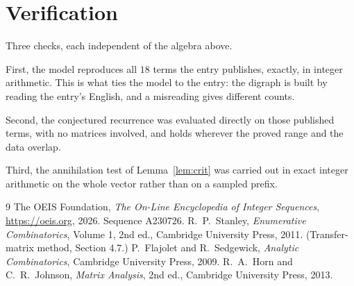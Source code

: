 \documentclass[11pt,a4paper]{article}
\theoremstyle{plain}
\theoremstyle{definition}
\begin{document}
\section{Verification}

Three checks, each independent of the algebra above.

First, the model reproduces all $18$ terms the entry publishes, exactly, in integer
arithmetic. This is what ties the model to the entry: the digraph is built by reading the
entry's English, and a misreading gives different counts.

Second, the conjectured recurrence was evaluated directly on those published terms, with no
matrices involved, and holds wherever the proved range and the data overlap.

Third, the annihilation test of Lemma~\ref{lem:crit} was carried out in exact integer
arithmetic on the whole vector rather than on a sampled prefix.

\begin{thebibliography}{9}
 The OEIS Foundation, \emph{The On-Line Encyclopedia of Integer
Sequences}, \url{https://oeis.org}, 2026. Sequence A230726.
 R.~P.~Stanley, \emph{Enumerative Combinatorics}, Volume 1, 2nd ed.,
Cambridge University Press, 2011. (Transfer-matrix method, Section 4.7.)
 P.~Flajolet and R.~Sedgewick, \emph{Analytic Combinatorics}, Cambridge
University Press, 2009.
 R.~A.~Horn and C.~R.~Johnson, \emph{Matrix Analysis}, 2nd ed., Cambridge
University Press, 2013.
\end{thebibliography}
\end{document}
